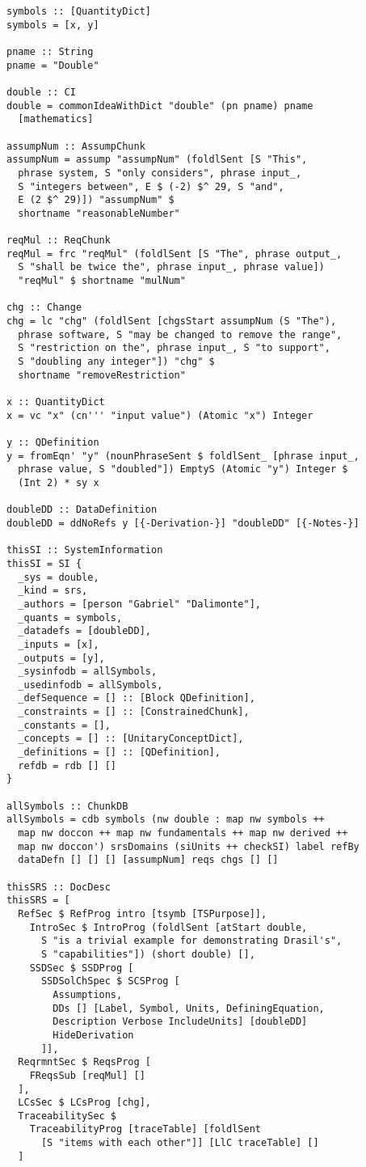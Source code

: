 \begin{tcolorbox}[breakable, toprule at break=0pt, bottomrule at break=0pt]
\begin{verbatim}
symbols :: [QuantityDict]
symbols = [x, y]

pname :: String
pname = "Double"

double :: CI
double = commonIdeaWithDict "double" (pn pname) pname
  [mathematics]

assumpNum :: AssumpChunk
assumpNum = assump "assumpNum" (foldlSent [S "This",
  phrase system, S "only considers", phrase input_,
  S "integers between", E $ (-2) $^ 29, S "and",
  E (2 $^ 29)]) "assumpNum" $
  shortname "reasonableNumber"

reqMul :: ReqChunk
reqMul = frc "reqMul" (foldlSent [S "The", phrase output_,
  S "shall be twice the", phrase input_, phrase value])
  "reqMul" $ shortname "mulNum"

chg :: Change
chg = lc "chg" (foldlSent [chgsStart assumpNum (S "The"),
  phrase software, S "may be changed to remove the range",
  S "restriction on the", phrase input_, S "to support",
  S "doubling any integer"]) "chg" $
  shortname "removeRestriction"

x :: QuantityDict
x = vc "x" (cn''' "input value") (Atomic "x") Integer

y :: QDefinition
y = fromEqn' "y" (nounPhraseSent $ foldlSent_ [phrase input_,
  phrase value, S "doubled"]) EmptyS (Atomic "y") Integer $
  (Int 2) * sy x

doubleDD :: DataDefinition
doubleDD = ddNoRefs y [{-Derivation-}] "doubleDD" [{-Notes-}]

thisSI :: SystemInformation
thisSI = SI {
  _sys = double,
  _kind = srs,
  _authors = [person "Gabriel" "Dalimonte"],
  _quants = symbols,
  _datadefs = [doubleDD],
  _inputs = [x],
  _outputs = [y],
  _sysinfodb = allSymbols,
  _usedinfodb = allSymbols,
  _defSequence = [] :: [Block QDefinition],
  _constraints = [] :: [ConstrainedChunk],
  _constants = [],
  _concepts = [] :: [UnitaryConceptDict],
  _definitions = [] :: [QDefinition],
  refdb = rdb [] []
}

allSymbols :: ChunkDB
allSymbols = cdb symbols (nw double : map nw symbols ++
  map nw doccon ++ map nw fundamentals ++ map nw derived ++
  map nw doccon') srsDomains (siUnits ++ checkSI) label refBy
  dataDefn [] [] [] [assumpNum] reqs chgs [] []

thisSRS :: DocDesc
thisSRS = [
  RefSec $ RefProg intro [tsymb [TSPurpose]],
    IntroSec $ IntroProg (foldlSent [atStart double,
      S "is a trivial example for demonstrating Drasil's",
      S "capabilities"]) (short double) [],
    SSDSec $ SSDProg [
      SSDSolChSpec $ SCSProg [
        Assumptions,
        DDs [] [Label, Symbol, Units, DefiningEquation,
        Description Verbose IncludeUnits] [doubleDD]
        HideDerivation
      ]],
  ReqrmntSec $ ReqsProg [
    FReqsSub [reqMul] []
  ],
  LCsSec $ LCsProg [chg],
  TraceabilitySec $
    TraceabilityProg [traceTable] [foldlSent
      [S "items with each other"]] [LlC traceTable] []
  ]


\end{verbatim}
\end{tcolorbox}
